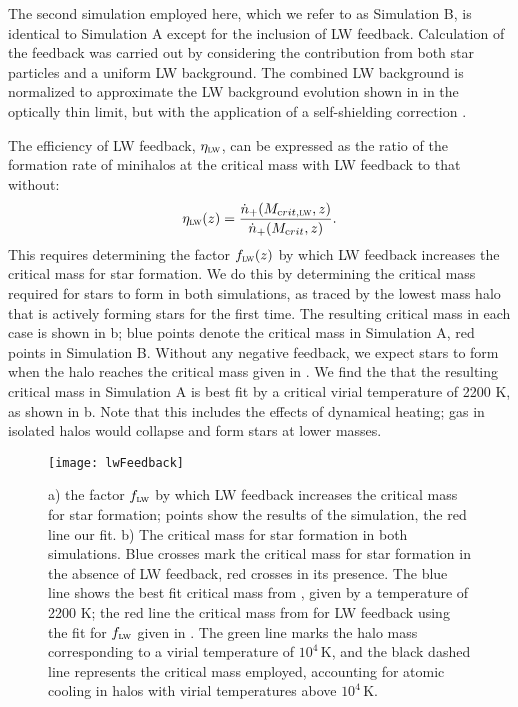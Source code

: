 \documentclass[../thesis.tex]{subfiles}
\begin{document}
The second simulation employed here, which we refer to as Simulation
B, is identical to Simulation A except for the inclusion of LW
feedback.  Calculation of the feedback was carried out by considering
the contribution from both star particles and a uniform LW background.
The combined LW background is normalized to approximate the LW
background evolution shown in \citet{GreifBromm2006} in the optically
thin limit, but with the application of a self-shielding correction
\citep{Wolcott-GreenHaimanBryan2011}.


The efficiency of LW feedback, $\eta_{\textsc{lw}}$, can be expressed
as the ratio of the formation rate of minihalos at the critical mass
with LW feedback to that without:
\begin{equation}
  \eta_{\textsc{lw}}(z) = \frac{ \dot{n}_{+}(M_{\mathrm crit, \textsc{lw}},
    z) }{ \dot{n}_{+}(M_{\mathrm crit}, z)}.
\end{equation}
This requires determining the factor $f_{\textsc{lw}}(z)$ by which LW
feedback increases the critical mass for star formation.  We do this
by determining the critical mass required for stars to form in both
simulations, as traced by the lowest mass halo that is actively
forming stars for the first time.  The resulting critical mass in each
case is shown in b; blue points denote the critical
mass in Simulation A, red points in Simulation B.  Without any
negative feedback, we expect stars to form when the halo reaches the
critical mass given in .  We find the that the resulting critical
mass in Simulation A is best fit by a critical virial temperature of
2200 K, as shown in b.  Note that this includes the
effects of dynamical heating; gas in isolated halos would collapse and
form stars at lower masses.

\begin{figure}
 \begin{center}
   \texttt{[image: lwFeedback]}
   \caption{a) the factor $f_{\textsc{lw}}$ by which
     LW feedback increases the critical mass for star formation;
     points show the results of the simulation, the red line our fit.
     b) The critical mass for star formation in both simulations.
     Blue crosses mark the critical mass for star formation in the
     absence of LW feedback, red crosses in its presence.  The blue
     line shows the best fit critical mass from , given
     by a temperature of 2200 K; the red line the critical mass from
      for LW feedback using the fit for
     $f_{\textsc{lw}}$ given in .  The green line marks
     the halo mass corresponding to a virial temperature of $10^4\,$K,
     and the black dashed line represents the critical mass employed,
     accounting for atomic cooling in halos with virial temperatures
     above $10^4\,$K.}
   \label{lwFeedback}
 \end{center}
\end{figure}
\end{document}
